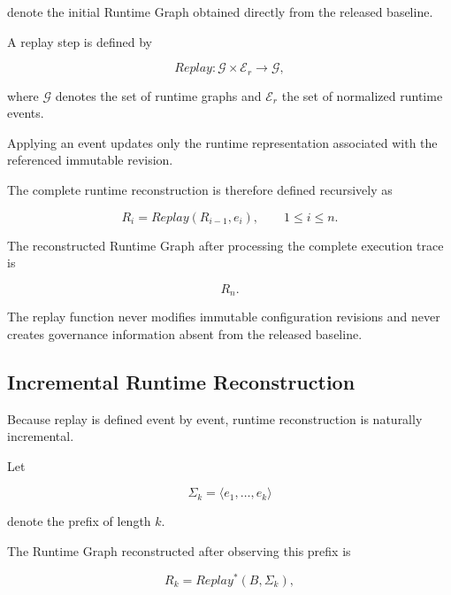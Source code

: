 \documentclass[10pt]{article}
\begin{document}
	denote the initial Runtime Graph obtained directly from the released baseline.
	
	A replay step is defined by
	
	\begin{equation}
		Replay
		:
		\mathcal G
		\times
		\mathcal E_r
		\rightarrow
		\mathcal G,
	\end{equation}
	
	where $\mathcal G$ denotes the set of runtime graphs and
	$\mathcal E_r$ the set of normalized runtime events.
	
	Applying an event updates only the runtime representation associated with the
	referenced immutable revision.
	
	The complete runtime reconstruction is therefore defined recursively as
	
	\begin{equation}
		R_i
		=
		Replay
		(
		R_{i-1},
		e_i
		),
		\qquad
		1\le i\le n.
	\end{equation}
	
	The reconstructed Runtime Graph after processing the complete execution trace is
	
	\[
	R_n.
	\]
	
	The replay function never modifies immutable configuration revisions and never
	creates governance information absent from the released baseline.
	
	\subsection{Incremental Runtime Reconstruction}
	\label{appendix:incremental_runtime_reconstruction}
	
	Because replay is defined event by event, runtime reconstruction is naturally
	incremental.
	
	Let
	
	\begin{equation}
		\Sigma_k
		=
		\langle
		e_1,\ldots,e_k
		\rangle
	\end{equation}
	
	denote the prefix of length $k$.
	
	The Runtime Graph reconstructed after observing this prefix is
	
	\begin{equation}
		R_k
		=
		Replay^*
		(
		B,
		\Sigma_k
		),
	\end{equation}
	
\end{document}
